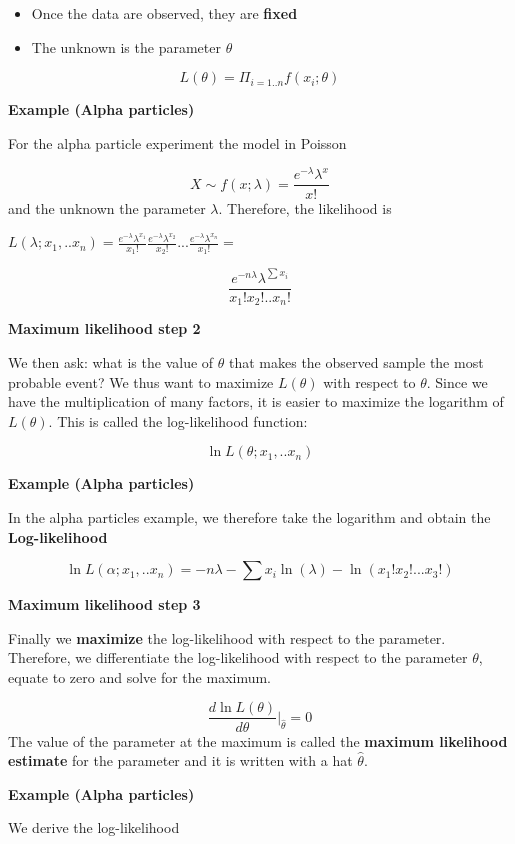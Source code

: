 \documentclass[
]{book}
\providecommand{\tightlist}{%
  \setlength{\itemsep}{0pt}\setlength{\parskip}{0pt}}
\begin{document}
\begin{itemize}
\tightlist
\item
  Once the data are observed, they are \textbf{fixed}
\item
  The unknown is the parameter \(\theta\)
\end{itemize}

\[L(\theta)= \Pi_{i=1..n} f(x_i; \theta)\]

\textbf{Example (Alpha particles)}

For the alpha particle experiment the model in Poisson

\[X \sim  f(x; \lambda)= \frac{e^{-\lambda}\lambda^x}{x!}\]
and the unknown the parameter \(\lambda\). Therefore, the likelihood is

\(L(\lambda;x_1,..x_n)= \frac{e^{-\lambda}\lambda^{x_1}}{x_1!}\frac{e^{-\lambda}\lambda^{x_2}}{x_2!}...\frac{e^{-\lambda}\lambda^{x_n}}{x_1!}=\)

\[\frac{e^{-n\lambda}\lambda^{\sum {x_i}}}{x_1!x_2!..x_n!}\]

\textbf{Maximum likelihood step 2}

We then ask: what is the value of \(\theta\) that makes the observed sample the most probable event? We thus want to maximize \(L(\theta)\) with respect to \(\theta\). Since we have the multiplication of many factors, it is easier to maximize the logarithm of \(L(\theta)\). This is called the log-likelihood function:

\[\ln L(\theta;x_1,..x_n)\]

\textbf{Example (Alpha particles)}

In the alpha particles example, we therefore take the logarithm and obtain the \textbf{Log-likelihood}

\[\ln L(\alpha;x_1,..x_n)= -n\lambda - \sum{x_i}\ln(\lambda)-\ln(x_1!x_2!...x_3!)\]

\textbf{Maximum likelihood step 3}

Finally we \textbf{maximize} the log-likelihood with respect to the parameter. Therefore, we differentiate the log-likelihood with respect to the parameter \(\theta\), equate to zero and solve for the maximum.

\[\frac{d \ln L(\theta)}{d \theta} \big|_{\hat{\theta}}=0 \]
The value of the parameter at the maximum is called the \textbf{maximum likelihood estimate} for the parameter and it is written with a hat \(\hat{\theta}\).

\textbf{Example (Alpha particles)}

We derive the log-likelihood
\end{document}
